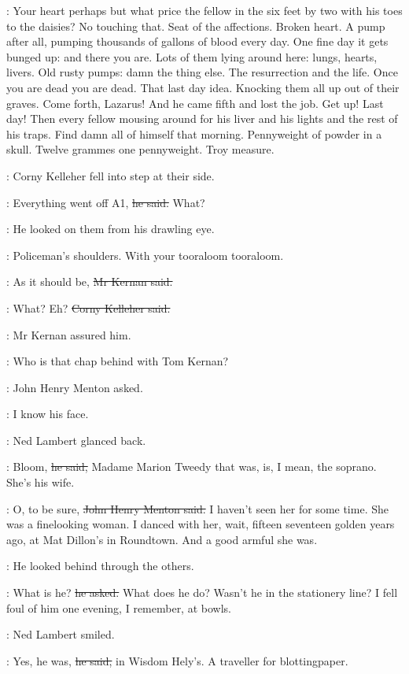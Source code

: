 \BloomInt:
Your heart perhaps but what price the fellow
in the six feet by two
with his toes to the daisies?
No touching that.
Seat of the affections.
Broken heart.
A pump after all, pumping thousands of gallons of blood every day.
One fine day it gets bunged up:
and there you are.
Lots of them lying around here:
lungs, hearts, livers.
Old rusty pumps:
damn the thing else.
The resurrection and the life.
Once you are dead you are dead.
That last day idea.
Knocking them all up out of their graves.
Come forth, Lazarus!
And he came fifth and lost the job.
Get up!
Last day!
Then every fellow mousing around for his liver and his lights
and the rest of his traps.
Find damn all of himself that morning.
Pennyweight of powder in a skull.
Twelve grammes one pennyweight.
Troy measure.

:
Corny Kelleher fell into step at their side.

\corny:
Everything went off A1,
\sout{he said.}
What?

:
He looked on them from his drawling eye.

\BloomInt:
Policeman's shoulders.
With your tooraloom tooraloom.

:
As it should be,
\sout{Mr Kernan said.}

\corny:
What?
Eh?
\sout{Corny Kelleher said.}

:
Mr Kernan assured him.

\menton:
Who is that chap behind with Tom Kernan?

:
John Henry Menton asked.

\menton:
I know his face.

:
Ned Lambert glanced back.

\lambert:
Bloom,
\sout{he said,}
Madame Marion Tweedy that was,
is, I mean,
the soprano.
She's his wife.

\menton:
O, to be sure,
\sout{John Henry Menton said.}
I haven't seen her for some time.
She was a finelooking woman.
I danced with her, wait, fifteen seventeen golden years ago,
at Mat Dillon's in Roundtown.
And a good armful she was.

:
He looked behind through the others.

\menton:
What is he?
\sout{he asked.}
What does he do?
Wasn't he in the stationery line?
I fell foul of him one evening, I remember, at bowls.

:
Ned Lambert smiled.

\lambert:
Yes, he was,
\sout{he said,}
in Wisdom Hely's.
A traveller for blottingpaper.

